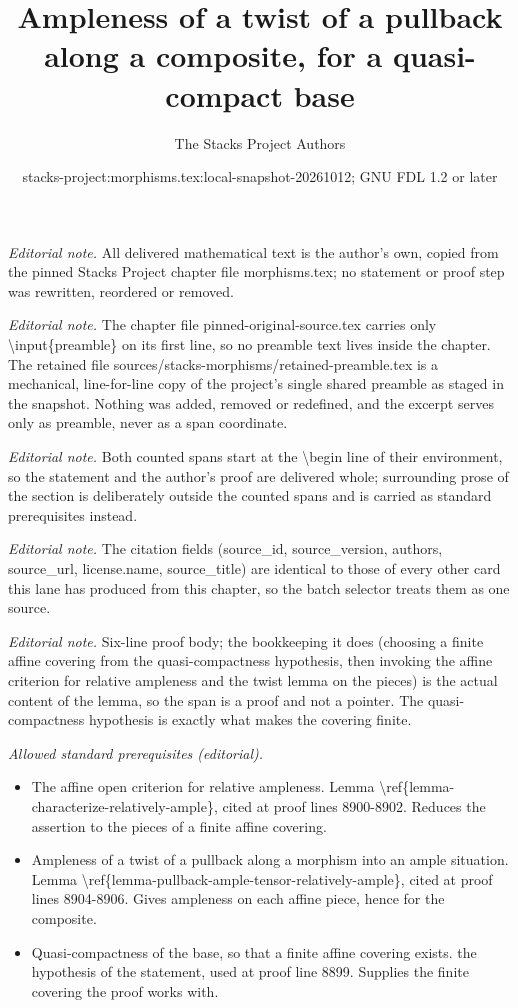 \documentclass[10pt,a4paper]{amsart}
\title{Ampleness of a twist of a pullback along a composite, for a quasi-compact base}
\author{The Stacks Project Authors}
\date{stacks-project:morphisms.tex:local-snapshot-20261012; GNU FDL 1.2 or later}
\theoremstyle{plain}
\theoremstyle{definition}
\theoremstyle{remark}
\numberwithin{equation}{subsection}
\begin{document}
\maketitle
\setcounter{subsection}{1}
\noindent\textit{Editorial note.} All delivered mathematical text is the author's own, copied from the pinned Stacks Project chapter file morphisms.tex; no statement or proof step was rewritten, reordered or removed.\par\medskip
\noindent\textit{Editorial note.} The chapter file pinned-original-source.tex carries only \textbackslash{}input\{preamble\} on its first line, so no preamble text lives inside the chapter. The retained file sources/stacks-morphisms/retained-preamble.tex is a mechanical, line-for-line copy of the project's single shared preamble as staged in the snapshot. Nothing was added, removed or redefined, and the excerpt serves only as preamble, never as a span coordinate.\par\medskip
\noindent\textit{Editorial note.} Both counted spans start at the \textbackslash{}begin line of their environment, so the statement and the author's proof are delivered whole; surrounding prose of the section is deliberately outside the counted spans and is carried as standard prerequisites instead.\par\medskip
\noindent\textit{Editorial note.} The citation fields (source\_id, source\_version, authors, source\_url, license.name, source\_title) are identical to those of every other card this lane has produced from this chapter, so the batch selector treats them as one source.\par\medskip
\noindent\textit{Editorial note.} Six-line proof body; the bookkeeping it does (choosing a finite affine covering from the quasi-compactness hypothesis, then invoking the affine criterion for relative ampleness and the twist lemma on the pieces) is the actual content of the lemma, so the span is a proof and not a pointer. The quasi-compactness hypothesis is exactly what makes the covering finite.\par\medskip
\noindent\textit{Allowed standard prerequisites (editorial).}\begin{itemize}
\item The affine open criterion for relative ampleness. Lemma \textbackslash{}ref\{lemma-characterize-relatively-ample\}, cited at proof lines 8900-8902. Reduces the assertion to the pieces of a finite affine covering.
\item Ampleness of a twist of a pullback along a morphism into an ample situation. Lemma \textbackslash{}ref\{lemma-pullback-ample-tensor-relatively-ample\}, cited at proof lines 8904-8906. Gives ampleness on each affine piece, hence for the composite.
\item Quasi-compactness of the base, so that a finite affine covering exists. the hypothesis of the statement, used at proof line 8899. Supplies the finite covering the proof works with.
\end{itemize}\medskip
\end{document}
